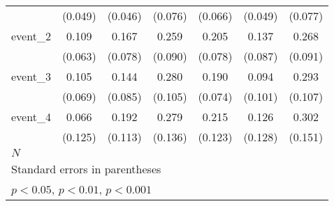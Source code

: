 {\begin{tabular}{l*{6}{c}}
            &     (0.049)         &     (0.046)         &     (0.076)         &     (0.066)         &     (0.049)         &     (0.077)         \\
[1em]
event\_2     &       0.109         &       0.167\sym{*}  &       0.259\sym{**} &       0.205\sym{**} &       0.137         &       0.268\sym{**} \\
            &     (0.063)         &     (0.078)         &     (0.090)         &     (0.078)         &     (0.087)         &     (0.091)         \\
[1em]
event\_3     &       0.105         &       0.144         &       0.280\sym{**} &       0.190\sym{*}  &       0.094         &       0.293\sym{**} \\
            &     (0.069)         &     (0.085)         &     (0.105)         &     (0.074)         &     (0.101)         &     (0.107)         \\
[1em]
event\_4     &       0.066         &       0.192         &       0.279\sym{*}  &       0.215         &       0.126         &       0.302\sym{*}  \\
            &     (0.125)         &     (0.113)         &     (0.136)         &     (0.123)         &     (0.128)         &     (0.151)         \\
\hline
\(N\)       &                     &                     &                     &                     &                     &                     \\
\hline\hline
\multicolumn{7}{l}{\footnotesize Standard errors in parentheses}\\
\multicolumn{7}{l}{\footnotesize \sym{*} \(p<0.05\), \sym{**} \(p<0.01\), \sym{***} \(p<0.001\)}\\
\end{tabular}
}
